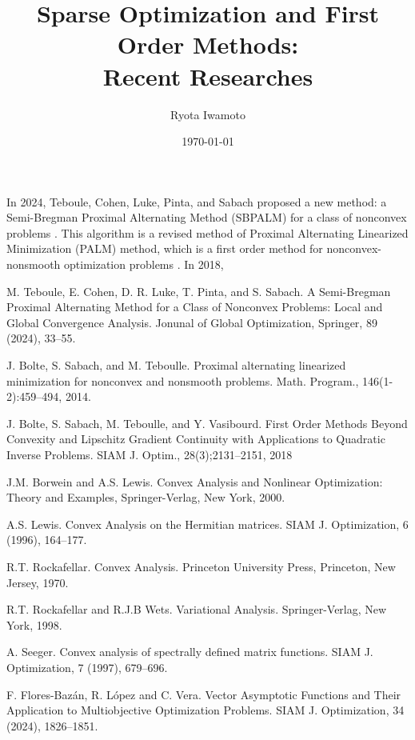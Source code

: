 \documentclass[a4paper,11pt]{jsarticle}
\theoremstyle{definition}
\begin{document}
\title{%
  Sparse Optimization and First Order Methods: \\
  Recent Researches}
\author{Ryota Iwamoto}
\date{\today}
\maketitle

In 2024, Teboule, Cohen, Luke, Pinta, and Sabach proposed a new method: a Semi-Bregman Proximal Alternating Method (SBPALM) for a class of nonconvex problems \cite{Teboulle2024}.
This algorithm is a revised method of Proximal Alternating Linearized Minimization (PALM) method, which is a first order method for nonconvex-nonsmooth optimization problems \cite{Bolte2014}.
In 2018,

\begin{thebibliography}{99}
  M. Teboule, E. Cohen, D. R. Luke, T. Pinta, and S. Sabach.
  A Semi-Bregman Proximal Alternating Method for a Class of Nonconvex Problems: Local and Global Convergence Analysis.
  Jonunal of Global Optimization, Springer, 89 (2024), 33--55.

  J. Bolte, S. Sabach, and M. Teboulle.
  Proximal alternating linearized minimization for nonconvex and nonsmooth problems.
  Math. Program., 146(1-2):459--494, 2014.

  J. Bolte, S. Sabach, M. Teboulle, and Y. Vasibourd.
  First Order Methods Beyond Convexity and Lipschitz Gradient Continuity with Applications to Quadratic Inverse Problems.
  SIAM J. Optim., 28(3);2131--2151, 2018


  J.M. Borwein and A.S. Lewis. Convex Analysis and Nonlinear Optimization: Theory and Examples, Springer-Verlag, New York, 2000.

  A.S. Lewis. Convex Analysis on the Hermitian matrices. SIAM J. Optimization, 6 (1996), 164--177.

  R.T. Rockafellar. Convex Analysis. Princeton University Press, Princeton, New Jersey, 1970.

  R.T. Rockafellar and R.J.B Wets. Variational Analysis. Springer-Verlag, New York, 1998.

  A. Seeger. Convex analysis of spectrally defined matrix functions. SIAM J. Optimization, 7 (1997), 679--696.

  F. Flores-Baz\'{a}n, R. L\'{o}pez and C. Vera. Vector Asymptotic Functions and Their Application to Multiobjective Optimization Problems. SIAM J. Optimization, 34 (2024), 1826--1851.


\end{thebibliography}
\end{document}
